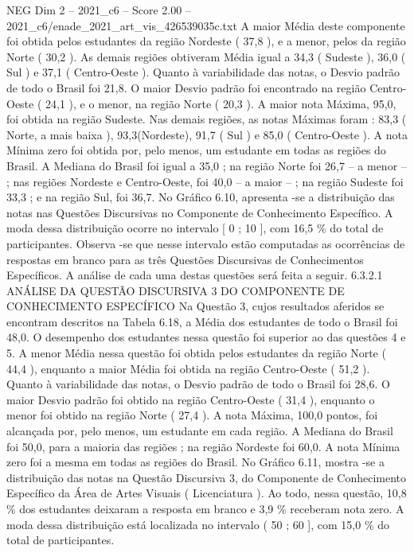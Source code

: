 \begin{textsample}{NEG Dim 2 – 2021\_c6 – Score 2.00 – 2021\_c6/enade\_2021\_art\_vis\_426539035c.txt}
A maior Média deste componente foi obtida pelos estudantes da região Nordeste ( 37,8 ), e a menor, pelos da região Norte ( 30,2 ).
As demais regiões obtiveram Média igual a 34,3 ( Sudeste ), 36,0 ( Sul ) e 37,1 ( Centro-Oeste ).
Quanto à variabilidade das notas, o Desvio padrão de todo o Brasil foi 21,8.
O maior Desvio padrão foi encontrado na região Centro-Oeste ( 24,1 ), e o menor, na região Norte ( 20,3 ).
A maior nota Máxima, 95,0, foi obtida na região Sudeste.
Nas demais regiões, as notas Máximas foram : 83,3 ( Norte, a mais baixa ), 93,3(Nordeste), 91,7 ( Sul ) e 85,0 ( Centro-Oeste ).
A nota Mínima zero foi obtida por, pelo menos, um estudante em todas as regiões do Brasil.
A Mediana do Brasil foi igual a 35,0 ; na região Norte foi 26,7 – a menor – ; nas regiões Nordeste e Centro-Oeste, foi 40,0 – a maior – ; na região Sudeste foi 33,3 ; e na região Sul, foi 36,7.
No Gráfico 6.10, apresenta -se a distribuição das notas nas Questões Discursivas no Componente de Conhecimento Específico.
A moda dessa distribuição ocorre no intervalo [ 0 ; 10 ], com 16,5 \% do total de participantes.
Observa -se que nesse intervalo estão computadas as ocorrências de respostas em branco para as três Questões Discursivas de Conhecimentos Específicos.
A análise de cada uma destas questões será feita a seguir. 6.3.2.1 ANÁLISE DA QUESTÃO DISCURSIVA 3 DO COMPONENTE DE CONHECIMENTO ESPECÍFICO Na Questão 3, cujos resultados aferidos se encontram descritos na Tabela 6.18, a Média dos estudantes de todo o Brasil foi 48,0.
O desempenho dos estudantes nessa questão foi superior ao das questões 4 e 5.
A menor Média nessa questão foi obtida pelos estudantes da região Norte ( 44,4 ), enquanto a maior Média foi obtida na região Centro-Oeste ( 51,2 ).
Quanto à variabilidade das notas, o Desvio padrão de todo o Brasil foi 28,6.
O maior Desvio padrão foi obtido na região Centro-Oeste ( 31,4 ), enquanto o menor foi obtido na região Norte ( 27,4 ).
A nota Máxima, 100,0 pontos, foi alcançada por, pelo menos, um estudante em cada região.
A Mediana do Brasil foi 50,0, para a maioria das regiões ; na região Nordeste foi 60,0.
A nota Mínima zero foi a mesma em todas as regiões do Brasil.
No Gráfico 6.11, mostra -se a distribuição das notas na Questão Discursiva 3, do Componente de Conhecimento Específico da Área de Artes Visuais ( Licenciatura ).
Ao todo, nessa questão, 10,8 \% dos estudantes deixaram a resposta em branco e 3,9 \% receberam nota zero.
A moda dessa distribuição está localizada no intervalo ( 50 ; 60 ], com 15,0 \% do total de participantes.

\end{textsample}
